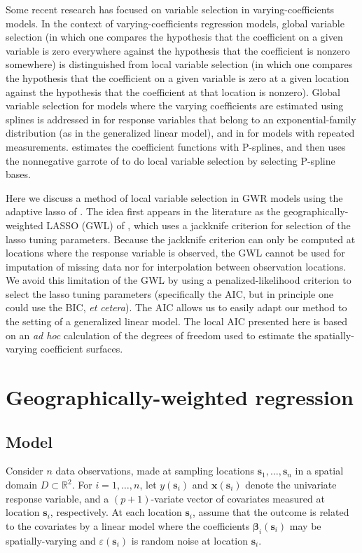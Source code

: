 \documentclass[authoryear, review, 11pt]{elsarticle}
\begin{document}
	Some recent research has focused on variable selection in varying-coefficients models. In the context of varying-coefficients regression models, global variable selection (in which one compares the hypothesis that the coefficient on a given variable is zero everywhere against the hypothesis that the coefficient is nonzero somewhere) is distinguished from local variable selection (in which one compares the hypothesis that the coefficient on a given variable is zero at a given location against the hypothesis that the coefficient at that location is nonzero). Global variable selection for models where the varying coefficients are estimated using splines is addressed in \cite{Fan:1999} for response variables that belong to an exponential-family distribution (as in the generalized linear model), and in \cite{Wang:2008a} for models with repeated measurements. \cite{Antoniadis:2012a} estimates the coefficient functions with P-splines, and then uses the nonnegative garrote of \cite{Breiman:1995} to do local variable selection by selecting P-spline bases.
	
	Here we discuss a method of local variable selection in GWR models using the adaptive lasso of \cite{Zou:2006}. The idea first appears in the literature as the geographically-weighted LASSO (GWL) of \cite{Wheeler:2009}, which uses a jackknife criterion for selection of the lasso tuning parameters. Because the jackknife criterion can only be computed at locations where the response variable is observed, the GWL cannot be used for imputation of missing data nor for interpolation between observation locations. We avoid this limitation of the GWL by using a penalized-likelihood criterion to select the lasso tuning parameters (specifically the AIC, but in principle one could use the BIC, \emph{et cetera}). The AIC allows us to easily adapt our method to the setting of a generalized linear model. The local AIC presented here is based on an \emph{ad hoc} calculation of the degrees of freedom used to estimate the spatially-varying coefficient surfaces.
	
\section{Geographically-weighted regression \label{section:GWR}}

	\subsection{Model}
	Consider $n$ data observations, made at sampling locations $\bm{s}_1, \dots, \bm{s}_n$ in a spatial domain $D \subset \mathbb{R}^2$. For $i = 1, \dots, n$, let $y(\bm{s}_i)$ and $\bm{x}(\bm{s}_i)$ denote the univariate response variable, and a $(p+1)$-variate vector of covariates measured at location $\bm{s}_i$, respectively. At each location $\bm{s}_i$, assume that the outcome is related to the covariates by a linear model where the coefficients $\bm{\beta}_i(\bm{s}_i)$ may be spatially-varying and $\varepsilon(\bm{s}_i)$ is random noise at location $\bm{s}_i$.
\end{document}
